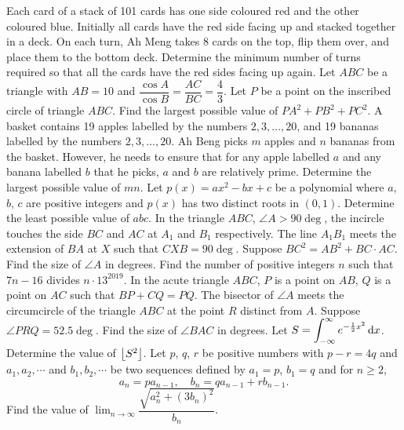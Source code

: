 \begin{enumerate}
    \hyperrefitem[Q::2021-O-1-17] Each card of a stack of 101 cards has one side coloured red and the other coloured blue. Initially all cards have the red side facing up and stacked together in a deck. On each turn, Ah Meng takes 8 cards on the top, flip them over, and place them to the bottom deck. Determine the minimum number of turns required so that all the cards have the red sides facing up again.
    \hyperrefitem[Q::2021-O-1-18] Let $ABC$ be a triangle with $AB = 10$ and $\dfrac{\cos A}{\cos B} = \dfrac{AC}{BC} = \dfrac43$. Let $P$ be a point on the inscribed circle of triangle $ABC$. Find the largest possible value of $PA^2 + PB^2 + PC^2$.
    \hyperrefitem[Q::2021-O-1-19] A basket contains 19 apples labelled by the numbers $2, 3, \ldots, 20$, and 19 bananas labelled by the numbers $2, 3, \ldots, 20$. Ah Beng picks $m$ apples and $n$ bananas from the basket. However, he needs to ensure that for any apple labelled $a$ and any banana labelled $b$ that he picks, $a$ and $b$ are relatively prime. Determine the largest possible value of $mn$.
    \hyperrefitem[Q::2021-O-1-20] Let $p(x) = ax^2 - bx + c$ be a polynomial where $a$, $b$, $c$ are positive integers and $p(x)$ has two distinct roots in $(0, 1)$. Determine the least possible value of $abc$.
    \hyperrefitem[Q::2021-O-1-21] In the triangle $ABC$, $\angle A > 90\deg$, the incircle touches the side $BC$ and $AC$ at $A_1$ and $B_1$ respectively. The line $A_1 B_1$ meets the extension of $BA$ at $X$ such that $CXB = 90\deg$. Suppose $BC^2 = AB^2 + BC \cdot AC$. Find the size of $\angle A$ in degrees.
    \hyperrefitem[Q::2021-O-1-22] Find the number of positive integers $n$ such that $7n-16$ divides $n \cdot 13^{2019}$.
    \hyperrefitem[Q::2021-O-1-23] In the acute triangle $ABC$, $P$ is a point on $AB$, $Q$ is a point on $AC$ such that $BP + CQ = PQ$. The bisector of $\angle A$ meets the circumcircle of the triangle $ABC$ at the point $R$ distinct from $A$. Suppose $\angle PRQ = 52.5\deg$. Find the size of $\angle BAC$ in degrees.
    \hyperrefitem[Q::2021-O-1-24] Let $S = \displaystyle\int_{-\infty}^\infty e^{-\frac12 x^2} \mathop{\mathrm{d}x}$. Determine the value of $\left\lfloor S^2 \right\rfloor$.
    \hyperrefitem[Q::2021-O-1-25] Let $p$, $q$, $r$ be positive numbers with $p-r= 4q$ and $a_1, a_2, \cdots$ and $b_1, b_2, \cdots$ be two sequences defined by $a_1 = p$, $b_1 = q$ and for $n \geq 2$, \[a_n = pa_{n-1}, \quad b_n = qa_{n-1} + rb_{n-1}.\] Find the value of $\displaystyle\lim_{n \to \infty} \dfrac{\sqrt{a_n^2 + (3b_n)^2}}{b_n}$.
\end{enumerate}
